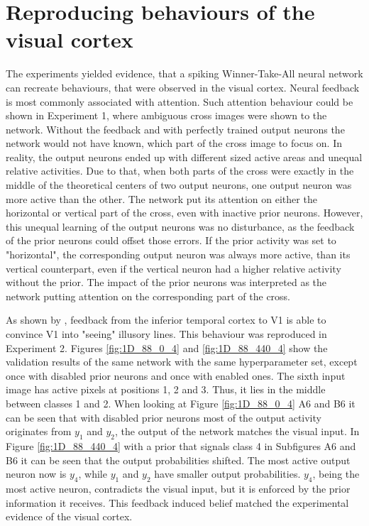 \section{Reproducing behaviours of the visual cortex}
The experiments yielded evidence, that a spiking Winner-Take-All neural network can recreate behaviours, that were observed in the visual cortex. Neural feedback is most commonly associated with attention. Such attention behaviour could be shown in Experiment 1, where ambiguous cross images were shown to the network. Without the feedback and with perfectly trained output neurons the network would not have known, which part of the cross image to focus on. In reality, the output neurons ended up with different sized active areas and unequal relative activities. Due to that, when both parts of the cross were exactly in the middle of the theoretical centers of two output neurons, one output neuron was more active than the other. The network put its attention on either the horizontal or vertical part of the cross, even with inactive prior neurons. However, this unequal learning of the output neurons was no disturbance, as the feedback of the prior neurons could offset those errors. If the prior activity was set to "horizontal", the corresponding output neuron was always more active, than its vertical counterpart, even if the vertical neuron had a higher relative activity without the prior. The impact of the prior neurons was interpreted as the network putting attention on the corresponding part of the cross.

As shown by \citet{HierachicalBayesVisualCortex}, feedback from the inferior temporal cortex to V1 is able to convince V1 into "seeing" illusory lines. This behaviour was reproduced in Experiment 2. Figures \ref{fig:1D_88_0_4} and \ref{fig:1D_88_440_4} show the validation results of the same network with the same hyperparameter set, except once with disabled prior neurons and once with enabled ones. The sixth input image has active pixels at positions 1, 2 and 3. Thus, it lies in the middle between classes 1 and 2. When looking at Figure \ref{fig:1D_88_0_4} A6 and B6 it can be seen that with disabled prior neurons most of the output activity originates from $y_1$ and $y_2$, the output of the network  matches the visual input. In Figure \ref{fig:1D_88_440_4} with a prior that signals class 4 in Subfigures A6 and B6 it can be seen that the output probabilities shifted. The most active output neuron now is $y_4$, while $y_1$ and $y_2$ have smaller output probabilities. $y_4$, being the most active neuron, contradicts the visual input, but it is enforced by the prior information it receives. This feedback induced belief matched the experimental evidence of the visual cortex.


